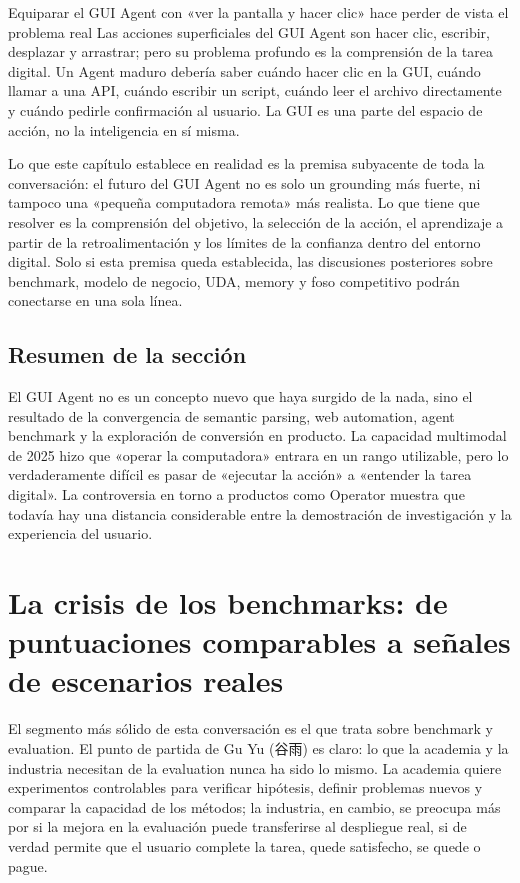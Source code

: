 \documentclass[a4paper]{article}
\begin{document}
\begin{warningbox}{Equiparar el GUI Agent con «ver la pantalla y hacer clic» hace perder de vista el problema real}
Las acciones superficiales del GUI Agent son hacer clic, escribir, desplazar y arrastrar; pero su problema profundo es la comprensión de la tarea digital. Un Agent maduro debería saber cuándo hacer clic en la GUI, cuándo llamar a una API, cuándo escribir un script, cuándo leer el archivo directamente y cuándo pedirle confirmación al usuario. La GUI es una parte del espacio de acción, no la inteligencia en sí misma.
\end{warningbox}

Lo que este capítulo establece en realidad es la premisa subyacente de toda la conversación: el futuro del GUI Agent no es solo un grounding más fuerte, ni tampoco una «pequeña computadora remota» más realista. Lo que tiene que resolver es la comprensión del objetivo, la selección de la acción, el aprendizaje a partir de la retroalimentación y los límites de la confianza dentro del entorno digital. Solo si esta premisa queda establecida, las discusiones posteriores sobre benchmark, modelo de negocio, UDA, memory y foso competitivo podrán conectarse en una sola línea.

\subsection{Resumen de la sección}

El GUI Agent no es un concepto nuevo que haya surgido de la nada, sino el resultado de la convergencia de semantic parsing, web automation, agent benchmark y la exploración de conversión en producto. La capacidad multimodal de 2025 hizo que «operar la computadora» entrara en un rango utilizable, pero lo verdaderamente difícil es pasar de «ejecutar la acción» a «entender la tarea digital». La controversia en torno a productos como Operator muestra que todavía hay una distancia considerable entre la demostración de investigación y la experiencia del usuario.
\section{La crisis de los benchmarks: de puntuaciones comparables a señales de escenarios reales}

El segmento más sólido de esta conversación es el que trata sobre benchmark y evaluation. El punto de partida de Gu Yu (谷雨) es claro: lo que la academia y la industria necesitan de la evaluation nunca ha sido lo mismo. La academia quiere experimentos controlables para verificar hipótesis, definir problemas nuevos y comparar la capacidad de los métodos; la industria, en cambio, se preocupa más por si la mejora en la evaluación puede transferirse al despliegue real, si de verdad permite que el usuario complete la tarea, quede satisfecho, se quede o pague.
\end{document}
